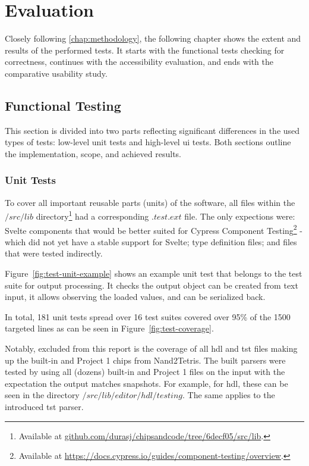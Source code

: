 \chapter{Evaluation}

Closely following \autoref{chap:methodology}, the following chapter shows the extent and results of the performed tests.
It starts with the functional tests checking for correctness, continues with the accessibility evaluation, and ends with the comparative usability study.

\section{Functional Testing}
\label{Evaluation-Tests}

This section is divided into two parts reflecting significant differences in the used types of tests: low-level unit tests and high-level \gls{ui} tests.
Both sections outline the implementation, scope, and achieved results.

\subsection{Unit Tests}

To cover all important reusable parts (units) of the software, all files within the $/src/lib$ directory\footnote{Available at \href{https://github.com/durasj/chipsandcode/tree/6decf05115ba1d4ca927de42f63c8431b1ac3124/src/lib}{github.com/durasj/chipsandcode/tree/6decf05/src/lib}.} had a corresponding $.test.ext$ file.
The only expections were: Svelte components that would be better suited for Cypress Component Testing\footnote{Available at \url{https://docs.cypress.io/guides/component-testing/overview}.} - which did not yet have a stable support for Svelte; type definition files; and files that were tested indirectly.

Figure~\ref{fig:test-unit-example} shows an example unit test that belongs to the test suite for output processing.
It checks the output object can be created from text input, it allows observing the loaded values, and can be serialized back.

In total, 181 unit tests spread over 16 test suites covered over 95\% of the 1500 targeted lines as can be seen in Figure~\ref{fig:test-coverage}.

Notably, excluded from this report is the coverage of all \gls{hdl} and \gls{tst} files making up the built-in and Project 1 chips from Nand2Tetris.
The built parsers were tested by using all (dozens) built-in and Project 1 files on the input with the expectation the output matches snapshots.
For example, for \gls{hdl}, these can be seen in the directory $/src/lib/editor/hdl/testing$.
The same applies to the introduced \gls{tst} parser.

